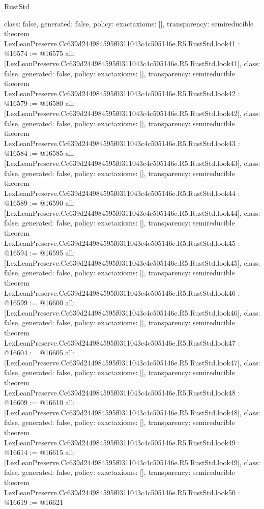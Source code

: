 \begin{lexlean}{RustStd}
\begin{coremodule}
{  class: false,
  generated: false,
  policy: exact{axioms: []},
  transparency: semireducible
}
theorem LexLeanPreserve.Cc639d244984595f0311043c4c505146e.R5.RustStd.look41 : @16574 := @16575 {
  all: [LexLeanPreserve.Cc639d244984595f0311043c4c505146e.R5.RustStd.look41],
  class: false,
  generated: false,
  policy: exact{axioms: []},
  transparency: semireducible
}
theorem LexLeanPreserve.Cc639d244984595f0311043c4c505146e.R5.RustStd.look42 : @16579 := @16580 {
  all: [LexLeanPreserve.Cc639d244984595f0311043c4c505146e.R5.RustStd.look42],
  class: false,
  generated: false,
  policy: exact{axioms: []},
  transparency: semireducible
}
theorem LexLeanPreserve.Cc639d244984595f0311043c4c505146e.R5.RustStd.look43 : @16584 := @16585 {
  all: [LexLeanPreserve.Cc639d244984595f0311043c4c505146e.R5.RustStd.look43],
  class: false,
  generated: false,
  policy: exact{axioms: []},
  transparency: semireducible
}
theorem LexLeanPreserve.Cc639d244984595f0311043c4c505146e.R5.RustStd.look44 : @16589 := @16590 {
  all: [LexLeanPreserve.Cc639d244984595f0311043c4c505146e.R5.RustStd.look44],
  class: false,
  generated: false,
  policy: exact{axioms: []},
  transparency: semireducible
}
theorem LexLeanPreserve.Cc639d244984595f0311043c4c505146e.R5.RustStd.look45 : @16594 := @16595 {
  all: [LexLeanPreserve.Cc639d244984595f0311043c4c505146e.R5.RustStd.look45],
  class: false,
  generated: false,
  policy: exact{axioms: []},
  transparency: semireducible
}
theorem LexLeanPreserve.Cc639d244984595f0311043c4c505146e.R5.RustStd.look46 : @16599 := @16600 {
  all: [LexLeanPreserve.Cc639d244984595f0311043c4c505146e.R5.RustStd.look46],
  class: false,
  generated: false,
  policy: exact{axioms: []},
  transparency: semireducible
}
theorem LexLeanPreserve.Cc639d244984595f0311043c4c505146e.R5.RustStd.look47 : @16604 := @16605 {
  all: [LexLeanPreserve.Cc639d244984595f0311043c4c505146e.R5.RustStd.look47],
  class: false,
  generated: false,
  policy: exact{axioms: []},
  transparency: semireducible
}
theorem LexLeanPreserve.Cc639d244984595f0311043c4c505146e.R5.RustStd.look48 : @16609 := @16610 {
  all: [LexLeanPreserve.Cc639d244984595f0311043c4c505146e.R5.RustStd.look48],
  class: false,
  generated: false,
  policy: exact{axioms: []},
  transparency: semireducible
}
theorem LexLeanPreserve.Cc639d244984595f0311043c4c505146e.R5.RustStd.look49 : @16614 := @16615 {
  all: [LexLeanPreserve.Cc639d244984595f0311043c4c505146e.R5.RustStd.look49],
  class: false,
  generated: false,
  policy: exact{axioms: []},
  transparency: semireducible
}
theorem LexLeanPreserve.Cc639d244984595f0311043c4c505146e.R5.RustStd.look50 : @16619 := @16621 {
}
\end{coremodule}
\end{lexlean}
